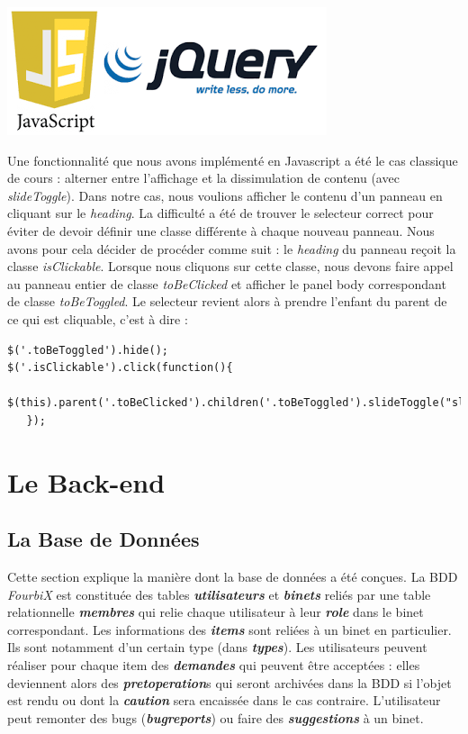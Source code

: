 \documentclass[titlepage,11pt,a4paper]{article}
\begin{document}
\begin{center}
\includegraphics[scale=0.25]{js-jquery.png}
\end{center}

Une fonctionnalité que nous avons implémenté en Javascript a été le cas classique de cours : alterner entre l'affichage et la dissimulation de contenu (avec \emph{slideToggle}). Dans notre cas, nous voulions afficher le contenu d'un panneau en cliquant sur le \emph{heading}. La difficulté a été de trouver le selecteur correct pour éviter de devoir définir une classe différente à chaque nouveau panneau. Nous avons pour cela décider de procéder comme suit : le \emph{heading} du panneau reçoit la classe \emph{isClickable}. Lorsque nous cliquons sur cette classe, nous devons faire appel au panneau entier de classe \emph{toBeClicked} et afficher le panel body correspondant de classe \emph{toBeToggled}. Le selecteur revient alors à prendre l'enfant du parent de ce qui est cliquable, c'est à dire : 

\begin{lstlisting}[title=Affichage des éléments dans un panneau]
$('.toBeToggled').hide();
$('.isClickable').click(function(){
   $(this).parent('.toBeClicked').children('.toBeToggled').slideToggle("slow");
   });
\end{lstlisting}


\section{Le Back-end}

\subsection{La Base de Données}

Cette section explique la manière dont la base de données a été conçues. La BDD \emph{FourbiX} est constituée des tables \textbf{\emph{utilisateurs}} et \textbf{\emph{binets}} reliés par une table relationnelle \textbf{\emph{membres}} qui relie chaque utilisateur à leur \textbf{\emph{role}} dans le binet correspondant. Les informations des \textbf{\emph{items}} sont reliées à un binet en particulier. Ils sont notamment d'un certain type (dans \textbf{\emph{types}}). Les utilisateurs peuvent réaliser pour chaque item des \textbf{\emph{demandes}} qui peuvent être acceptées : elles deviennent alors des \textbf{\emph{pretoperation}}s qui seront archivées dans la BDD si l'objet est rendu ou dont la \textbf{\emph{caution}} sera encaissée dans le cas contraire. L'utilisateur peut remonter des bugs (\textbf{\emph{bugreports}}) ou faire des \textbf{\emph{suggestions}} à un binet.\\
\end{document}
